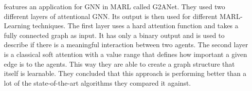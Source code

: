 \citet{G2ANet2020} features an application for GNN in MARL called G2ANet. They used two different layers of attentional GNN. Its output is then used for different MARL-Learning techniques. The first layer uses a hard attention function and takes a fully connected graph as input. It has only a binary output and is used to describe if there is a meaningful interaction between two agents. The second layer is a classical soft attention with a value range that defines how important a given edge is to the agents. This way they are able to create a graph structure that itself is learnable. They concluded that this approach is performing better than a lot of the state-of-the-art algorithms they compared it against.\par

